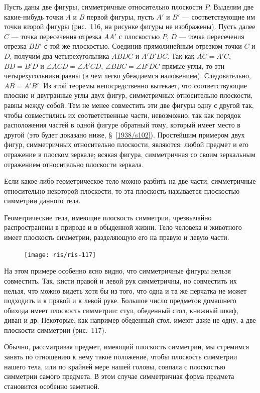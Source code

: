 \documentclass[twoside]{book}
\begin{document}
Пусть даны две фигуры, симметричные относительно плоскости $P$.
Выделим две какие-нибудь точки $A$ и $B$ первой фигуры, пусть $A'$ и $B'$ --- соответствующие им точки второй фигуры (рис.~116, на рисунке фигуры не изображены).
Пусть далее $C$ --- точка пересечения отрезка $AA'$ с плоскостью $P$, $D$ --- точка пересечения отрезка $BB'$ с той же плоскостью.
Соединив прямолинейным отрезком точки $C$ и $D$, получим два четырехугольника $ABDC$ и $A'B'DC$.
Так как $AC = A'C$, $BD = B'D$ и $\angle ACD = \angle A'CD$, $\angle BBC = \angle B'DC$ прямые углы, то эти четырехугольники равны (в чем легко убеждаемся наложением).
Следовательно, $AB=A'B'$.
Из этой теоремы непосредственно вытекает, что соответствующие плоские и двугранные углы двух фигур, симметричных относительно плоскости, равны между собой.
Тем не менее совместить эти две фигуры одну с другой так, чтобы совместились их соответственные части, невозможно, так как порядок расположения частей в одной фигуре обратный тому, который имеет место в другой (это будет доказано ниже, §~\ref{1938/s102}).
Простейшим примером двух фигур, симметричных относительно плоскости, являются: любой предмет и его отражение в плоском зеркале;
всякая фигура, симметричная со своим зеркальным отражением относительно плоскости зеркала.

Если какое-либо геометрическое тело можно разбить на две части, симметричные относительно некоторой плоскости, то эта плоскость называется плоскостью симметрии данного тела.

Геометрические тела, имеющие плоскость симметрии, чрезвычайно распространены в природе и в обыденной жизни.
Тело человека и животного имеет плоскость симметрии, разделяющую его на правую и левую части.

\begin{figure}[h!]
\centering
\texttt{[image: ris/ris-117]}
\caption{}
\end{figure}

На этом примере особенно ясно видно, что симметричные фигуры нельзя совместить.
Так, кисти правой и левой рук симметричны, но совместить их нельзя, что можно видеть хотя бы из того, что одна и та же перчатка не может подходить и к правой и к левой руке.
Большое число предметов домашнего обихода имеет плоскость симметрии: стул, обеденный стол, книжный шкаф, диван и др.
Некоторые, как например обеденный стол, имеют даже не одну, а две плоскости симметрии (рис.~117).

Обычно, рассматривая предмет, имеющий плоскость симметрии, мы стремимся занять по отношению к нему такое положение, чтобы плоскость симметрии нашего тела, или по крайней мере нашей головы, совпала с плоскостью симметрии самого предмета. %
В этом случае симметричная форма предмета становится особенно заметной.
\end{document}
